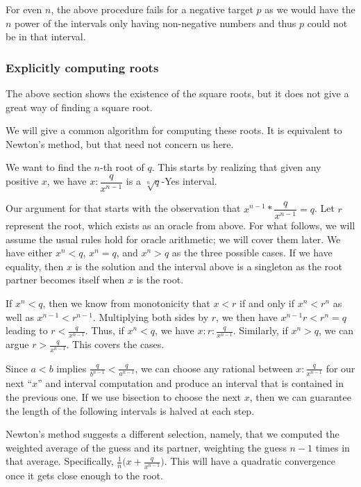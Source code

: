 \documentclass[12pt]{article}
\theoremstyle{remark}
\begin{document}
For even $n$, the above procedure fails for a negative target $p$ as we would have the $n$ power of the intervals only having non-negative numbers and thus $p$ could not be in that interval. 

\subsubsection{Explicitly computing roots}

The above section shows the existence of the square roots, but it does not give a great way of finding a square root. 

We will give a common algorithm for computing these roots. It is equivalent to Newton's method, but that need not concern us here. 

We want to find the $n$-th root of $q$. This starts by realizing that given any positive $x$, we have $x:\dfrac{q}{x^{n-1}}$ is a $\sqrt[n]{q}$-Yes interval. 

Our argument for that starts with the observation that $x^{n-1}*\dfrac{q}{x^{n-1}} = q$. Let $r$ represent the root, which exists as an oracle from above. For what follows, we will assume the usual rules hold for oracle arithmetic; we will cover them later. We have either $x^n < q$, $x^n = q$, and $x^n > q$ as the three possible cases. If we have equality, then $x$ is the solution and the interval above is a singleton as the root partner becomes itself when $x$ is the root. 

If $x^n < q$, then we know from monotonicity that $x < r$ if and only if $x^n < r^n$ as well as $x^{n-1} < r^{n-1}$. Multiplying both sides by $r$, we then have $x^{n-1} r < r^{n} = q$ leading to $r < \frac{q}{x^{n-1}}$. Thus, if $x^n < q$, we have $x:r:\frac{q}{x^{n-1}}$. Similarly, if $x^n > q$, we can argue $r > \frac{q}{x^{n-1}}$. This covers the cases. 

Since $a<b$ implies $\frac{q}{b^{n-1}} < \frac{q}{a^{n-1}}$, we can choose any rational between $x:\frac{q}{x^{n-1}}$ for our next ``$x$'' and interval computation and produce an interval that is contained in the previous one. If we use bisection to choose the next $x$, then we can guarantee the length of the following intervals is halved at each step. 

Newton's method suggests a different selection, namely, that we computed the weighted average of the guess and its partner, weighting the guess $n-1$ times in that average. Specifically, $\frac{1}{n} \big( x + \frac{q}{x^{n-1}} \big)$. This will have a quadratic convergence once it gets close enough to the root. 
\end{document}
